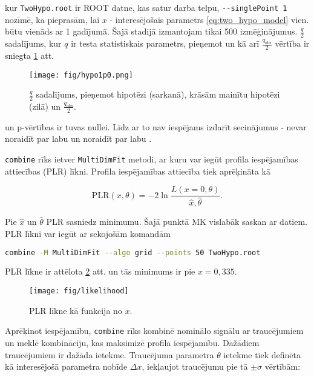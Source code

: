 kur  \lstinline[language=sh]|TwoHypo.root| ir ROOT datne, kas satur darba telpu, \lstinline[language=sh]|--singlePoint 1| nozīmē, ka pieprasām, lai $x$ - interesējošais parametrs \ref{eq:two_hypo_model} vien. būtu vienāds ar 1 \Halt gadījumā. Šajā stadijā izmantojam tikai 500 izmēģinājumus. $\frac{q}{2}$ sadalījums, kur $q$ ir testa statistiskais parametrs, pieņemot \Hnull un \Halt kā arī $\frac{q_{\text{obs}}}{2}$ vērtība ir sniegta \ref{fig:hypo1p0} att.

\begin{figure}
  \centering
  \texttt{[image: fig/hypo1p0.png]}
  \caption{$\frac{q}{2}$ sadalījums, pieņemot \ttbar hipotēzi (sarkanā), krāsām mainītu \ttbar hipotēzi (zilā) un $\frac{q_{\text{obs}}}{2}$.}
  \label{fig:hypo1p0}
\end{figure}

\Halt un \Hnull p-vērtības ir tuvas nullei. Līdz ar to nav iespējams izdarīt secinājumus - nevar noraidīt \Hnull par labu \Halt un noraidīt \Halt par labu \Hnull.

\lstinline[language=sh]|combine| rīks ietver \lstinline[language=sh]|MultiDimFit| metodi, ar kuru var iegūt profila iespējamības attiecības (PLR) līkni. Profila iespējamības attiecība tiek aprēķināta kā

\begin{equation}
  \text{PLR}(x, \theta)=-2\ln\frac{L(x=0, \theta)}{\hat{x}, \hat{\theta}}.
\end{equation}

Pie $\hat{x}$ un $\hat{\theta}$ PLR sasniedz minimumu. Šajā punktā MK vislabāk saskan ar datiem. PLR līkni var iegūt ar sekojošām komandām

\begin{lstlisting}[language=sh, breaklines=true]
combine -M MultiDimFit --algo grid --points 50 TwoHypo.root
\end{lstlisting}

PLR līkne ir attēlota \ref{fig:likelihood} att. un tās minimums ir pie $x=0,335$.

\begin{figure}
  \centering
  \texttt{[image: fig/likelihood]}
  \caption{PLR līkne kā funkcija no $x$.}
  \label{fig:likelihood}
\end{figure}

Aprēķinot iespējamību, \lstinline[language=sh]|combine| rīks kombinē nominālo signālu ar traucējumiem un meklē kombināciju, kas maksimizē profila iespējamību. Dažādiem traucējumiem ir dažāda ietekme. Traucējuma parametra $\theta$ ietekme tiek definēta kā interesējošā parametra nobīde $\Delta x$, iekļaujot traucējumu pie tā $\pm\sigma$ vērtībām:

